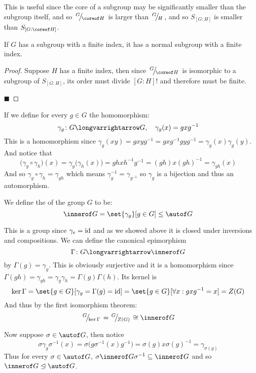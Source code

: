 \documentclass[10pt]{article}
\def\slfrac#1#2{\left.{}^{#1}\mkern-4mu\middle/\mkern-3mu{}_{#2}\right.}
\let\normalsub=\trianglelefteq
\begin{document}
This is useful since the core of a subgroup may be significantly smaller than the subgroup itself, and so $\slfrac G{\coreof H}$ is larger than $\slfrac GH$, and so $S_{[G:H]}$ is smaller than
$S_{[G:\coreof H]}$.

\begin{prop*}

    If $G$ has a subgroup with a finite index, it has a normal subgroup with a finite index.

\end{prop*}

\begin{proof}

    Suppose $H$ has a finite index, then since $\slfrac{G}{\coreof H}$ is isomorphic to a subgroup of $S_{[G:H]}$, its order must divide $[G:H]!$ and therefore must be finite.

    \hfill$\blacksquare$

\end{proof}

\newpage
If we define for every $g\in G$ the homomorphism:
\[ \gamma_g\colon G\longvarrightarrow G,\quad \gamma_g(x)=gxg^{-1} \]
This is a homomorphism since $\gamma_g(xy)=gxyg^{-1}=gxg^{-1}gyg^{-1}=\gamma_g(x)\gamma_g(y)$.
And notice that
\[ \bigl(\gamma_g\circ\gamma_h\bigr)(x)=\gamma_g\bigl(\gamma_h(x)\bigr)=ghxh^{-1}g^{-1}=(gh)x(gh)^{-1}=\gamma_{gh}(x) \]
And so $\gamma_g\circ\gamma_h=\gamma_{gh}$ which means $\gamma_g^{-1}=\gamma_{g^{-1}}$ so $\gamma_g$ is a bijection and thus an automorphism.

\begin{defn*}

    We define the  of the group $G$ to be:
    \[ \innerof G=\set{\gamma_g}[g\in G] \leq \autof G \]

\end{defn*}

This is a group since $\gamma_e={\rm id}$ and as we showed above it is closed under inversions and compositions.
We can define the canonical epimorphism
\[ \Gamma\colon G\longvarrightarrow\innerof G \]
by $\Gamma(g)=\gamma_g$.
This is obviously surjective and it is a homomorphism since $\Gamma(gh)=\gamma_{gh}=\gamma_g\gamma_h=\Gamma(g)\Gamma(h)$.
Its kernel is
\[ \ker\Gamma = \set{g\in G}[\gamma_g=\Gamma(g)={\rm id}] = \set{g\in G}[\forall x: gxg^{-1}=x] = Z(G) \]
And thus by the first isomorphism theorem:
\[ \slfrac{G}{\ker\Gamma} = \slfrac{G}{Z(G)} \cong \innerof G \]

Now suppose $\sigma\in\autof G$, then notice
\[ \sigma\gamma_g\sigma^{-1}(x) = \sigma\bigl(g\sigma^{-1}(x)g^{-1}\bigr) = \sigma(g)x\sigma(g)^{-1} = \gamma_{\sigma(g)} \]
Thus for every $\sigma\in\autof G$, $\sigma\innerof G\sigma^{-1}\subseteq\innerof G$ and so $\innerof G\normalsub\autof G$.
\end{document}
